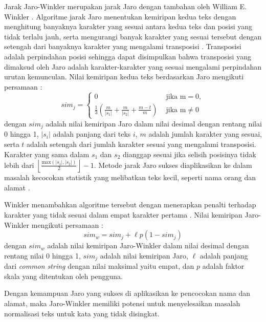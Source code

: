 Jarak Jaro-Winkler merupakan jarak Jaro dengan tambahan oleh William E. Winkler \parencite{winkler1990string}. Algoritme jarak Jaro menentukan kemiripan kedua teks dengan menghitung banyaknya karakter yang sesuai antara kedua teks dan posisi yang tidak terlalu jauh, serta mengurangi banyak karakter yang sesuai tersebut dengan setengah dari banyaknya karakter yang mengalami transposisi \parencite{van2014stringdist}. Transposisi adalah perpindahan posisi \parencite{kbbi} sehingga dapat disimpulkan bahwa transposisi yang dimaksud oleh Jaro adalah karakter-karakter yang sesuai mengalami perpindahan urutan kemunculan. Nilai kemiripan kedua teks berdasarkan Jaro mengikuti persamaan \parencite{jaro1989advances}:
\begin{equation} \label{eq:jaro}
	sim_{j}=\begin{cases}
		0 & \text{ jika m}=0, \\ 
		\frac{1}{3}\left ( \frac{m}{\left | s_{1} \right |} + \frac{m}{\left | s_{2} \right |} + \frac{m - t}{m} \right ) & \text{ jika m}\neq 0
	\end{cases}
\end{equation}
\noindent
dengan $sim_{j}$ adalah nilai kemiripan Jaro dalam nilai desimal dengan rentang nilai 0 hingga 1, $\left | s_{i} \right |$ adalah panjang dari teks $i$, $m$ adalah jumlah karakter yang sesuai, serta $t$ adalah setengah dari jumlah karakter sesuai yang mengalami transposisi. Karakter yang sama dalam $s_{1}$ dan $s_{2}$ dianggap sesuai jika selisih posisinya tidak lebih dari $\left \lfloor \frac{\text{max}\left ( |s_{1}|, |s_{2}| \right )}{2} \right \rfloor - 1$. Metode jarak Jaro sukses diaplikasikan ke dalam masalah kecocokan statistik yang melibatkan teks kecil, seperti nama orang dan alamat \parencite{jaro1989advances}.

Winkler menambahkan algoritme tersebut dengan menerapkan penalti terhadap karakter yang tidak sesuai dalam empat karakter pertama \parencite{van2014stringdist}. Nilai kemiripan Jaro-Winkler mengikuti persamaan \parencite{winkler1990string}:
\begin{equation} \label{eq:jw}
	sim_{w} = sim_{j} + \ell p(1-sim_{j})
\end{equation}
\noindent
dengan $sim_{w}$ adalah nilai kemiripan Jaro-Winkler dalam nilai desimal dengan rentang nilai 0 hingga 1, $sim_{j}$ adalah nilai kemiripan Jaro, $\ell$ adalah panjang dari \textit{common string} dengan nilai maksimal yaitu empat, dan $p$ adalah faktor skala yang ditentukan oleh pengguna.

Dengan kemampuan Jaro yang sukses di aplikasikan ke pencocokan nama dan alamat, maka Jaro-Winkler memiliki potensi untuk menyelesaikan masalah normalisasi teks untuk kata yang tidak disingkat.
